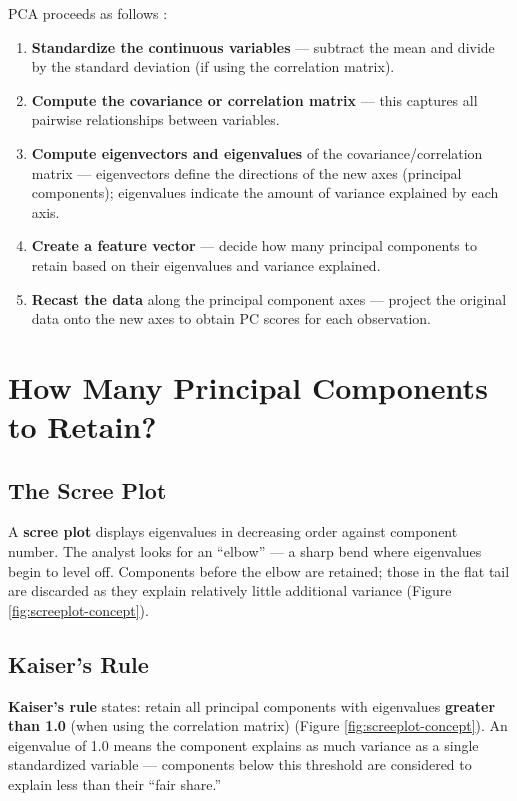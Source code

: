 \documentclass[
]{book}
\begin{document}
PCA proceeds as follows \citep{jaadi2025pca}:

\begin{enumerate}
\def\labelenumi{\arabic{enumi}.}
\item
  \textbf{Standardize the continuous variables} --- subtract the mean and divide by the standard deviation (if using the correlation matrix).
\item
  \textbf{Compute the covariance or correlation matrix} --- this captures all pairwise relationships between variables.
\item
  \textbf{Compute eigenvectors and eigenvalues} of the covariance/correlation matrix --- eigenvectors define the directions of the new axes (principal components); eigenvalues indicate the amount of variance explained by each axis.
\item
  \textbf{Create a feature vector} --- decide how many principal components to retain based on their eigenvalues and variance explained.
\item
  \textbf{Recast the data} along the principal component axes --- project the original data onto the new axes to obtain PC scores for each observation.
\end{enumerate}

\section{How Many Principal Components to Retain?}\label{how-many-principal-components-to-retain}

\subsection{The Scree Plot}\label{the-scree-plot}

A \textbf{scree plot} displays eigenvalues in decreasing order against component number. The analyst looks for an ``elbow'' --- a sharp bend where eigenvalues begin to level off. Components before the elbow are retained; those in the flat tail are discarded as they explain relatively little additional variance (Figure \ref{fig:screeplot-concept}).

\subsection{Kaiser's Rule}\label{kaisers-rule}

\textbf{Kaiser's rule} states: retain all principal components with eigenvalues \textbf{greater than 1.0} (when using the correlation matrix) (Figure \ref{fig:screeplot-concept}). An eigenvalue of 1.0 means the component explains as much variance as a single standardized variable --- components below this threshold are considered to explain less than their ``fair share.''
\end{document}
